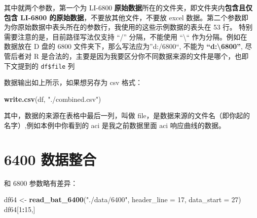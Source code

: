 \documentclass[]{krantz}
\makeatletter
\newenvironment{Shaded}{\begin{snugshade}}{\end{snugshade}}
\newcommand{\KeywordTok}[1]{\textcolor[rgb]{0.13,0.29,0.53}{\textbf{#1}}}
\newcommand{\DataTypeTok}[1]{\textcolor[rgb]{0.13,0.29,0.53}{#1}}
\newcommand{\DecValTok}[1]{\textcolor[rgb]{0.00,0.00,0.81}{#1}}
\newcommand{\StringTok}[1]{\textcolor[rgb]{0.31,0.60,0.02}{#1}}
\newcommand{\OperatorTok}[1]{\textcolor[rgb]{0.81,0.36,0.00}{\textbf{#1}}}
\newcommand{\NormalTok}[1]{#1}
\newenvironment{kframe}{%
\medskip{}
\setlength{\fboxsep}{.8em}
 \def\at@end@of@kframe{}%
 \ifinner\ifhmode%
  \def\at@end@of@kframe{\end{minipage}}%
  \begin{minipage}{\columnwidth}%
 \fi\fi%
 \def\FrameCommand##1{\hskip\@totalleftmargin \hskip-\fboxsep
 \colorbox{shadecolor}{##1}\hskip-\fboxsep
     \hskip-\linewidth \hskip-\@totalleftmargin \hskip\columnwidth}%
 \MakeFramed {\advance\hsize-\width
   \@totalleftmargin\z@ \linewidth\hsize
   \@setminipage}}%
 {\par\unskip\endMakeFramed%
 \at@end@of@kframe}
\renewenvironment{Shaded}{\begin{kframe}}{\end{kframe}}
\theoremstyle{definition}
\theoremstyle{definition}
\theoremstyle{definition}
\theoremstyle{remark}
\makeatother
\begin{document}
其中就两个参数，第一个为 LI-6800
\textbf{原始数据}所在的文件夹，即文件夹内\textbf{包含且仅包含 LI-6800
的原始数据}，不要放其他文件，不要放 excel
数据。第二个参数即为你原始数据中表头所在的参数行，我使用的这些示例数据的表头在
53 行。 特别需要注意的是，目前路径写法仅支持 ``/'' 分隔，不能使用
``\textbackslash{}`` 作为分隔。例如在数据放在 D 盘的 6800
文件夹下，那么写法应为''d:/6800``, 不能为
\textbf{``d:\textbackslash{}6800''}, 尽管后者对 R
是合法的，主要是因为我要区分你不同数据来源的文件是哪个，也即下文提到的
\texttt{df\$file} 列

数据输出如上所示，如果想另存为 csv 格式：

\begin{Shaded}
\begin{Highlighting}[]
\KeywordTok{write.csv}\NormalTok{(df, }\StringTok{"./combined.csv"}\NormalTok{)}
\end{Highlighting}
\end{Shaded}

其中，数据的来源在表格中最后一列，叫做
file，是数据来源的文件名（即你起的名字）,例如本例中你看到的 aci
是我之前数据里面 aci 响应曲线的数据。

\section{6400 数据整合}\label{batch64}

和 6800 参数略有差异：

\begin{Shaded}
\begin{Highlighting}[]
\NormalTok{df64  <-}\StringTok{ }\KeywordTok{read_bat_6400}\NormalTok{(}\StringTok{"./data/6400"}\NormalTok{, }\DataTypeTok{header_line =} \DecValTok{17}\NormalTok{, }\DataTypeTok{data_start =} \DecValTok{27}\NormalTok{)}
\NormalTok{df64[}\DecValTok{1}\OperatorTok{:}\DecValTok{15}\NormalTok{,]}
\end{Highlighting}
\end{Shaded}
\end{document}
